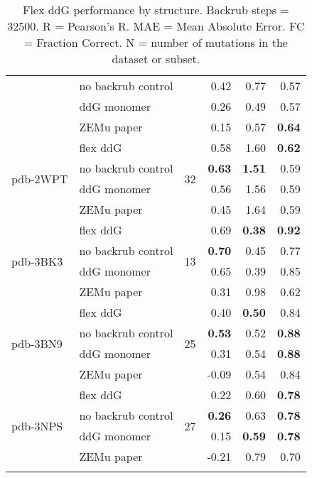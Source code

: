 \begin{longtable}{llrrrr}
 & no backrub control & & 0.42 & 0.77 & 0.57  \\
 & ddG monomer & & 0.26 & 0.49 & 0.57  \\
 & ZEMu paper & & 0.15 & 0.57 & \textbf{0.64}  \\
\hline
 \multirow{ 4}{*}{pdb-2WPT} & flex ddG & \multirow{ 4}{*}{32} & 0.58 & 1.60 & \textbf{0.62}  \\
 & no backrub control & & \textbf{0.63} & \textbf{1.51} & 0.59  \\
 & ddG monomer & & 0.56 & 1.56 & 0.59  \\
 & ZEMu paper & & 0.45 & 1.64 & 0.59  \\
\hline
 \multirow{ 4}{*}{pdb-3BK3} & flex ddG & \multirow{ 4}{*}{13} & 0.69 & \textbf{0.38} & \textbf{0.92}  \\
 & no backrub control & & \textbf{0.70} & 0.45 & 0.77  \\
 & ddG monomer & & 0.65 & 0.39 & 0.85  \\
 & ZEMu paper & & 0.31 & 0.98 & 0.62  \\
\hline
 \multirow{ 4}{*}{pdb-3BN9} & flex ddG & \multirow{ 4}{*}{25} & 0.40 & \textbf{0.50} & 0.84  \\
 & no backrub control & & \textbf{0.53} & 0.52 & \textbf{0.88}  \\
 & ddG monomer & & 0.31 & 0.54 & \textbf{0.88}  \\
 & ZEMu paper & & -0.09 & 0.54 & 0.84  \\
\hline
 \multirow{ 4}{*}{pdb-3NPS} & flex ddG & \multirow{ 4}{*}{27} & 0.22 & 0.60 & \textbf{0.78}  \\
 & no backrub control & & \textbf{0.26} & 0.63 & \textbf{0.78}  \\
 & ddG monomer & & 0.15 & \textbf{0.59} & \textbf{0.78}  \\
 & ZEMu paper & & -0.21 & 0.79 & 0.70  \\
  \caption[Flex ddG performance by structure]{
    Flex ddG performance by structure. Backrub steps = 32500. R = Pearson's R. MAE = Mean Absolute Error. FC = Fraction Correct. N = number of mutations in the dataset or subset.
  } \label{tab:table-by-structure}
\end{longtable}
